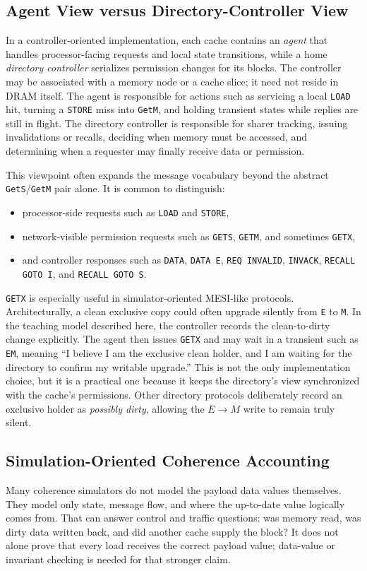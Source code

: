 \subsection*{Agent View versus Directory-Controller View}
In a controller-oriented implementation, each cache contains an \textit{agent} that handles processor-facing requests and local state transitions, while a home \textit{directory controller} serializes permission changes for its blocks.
The controller may be associated with a memory node or a cache slice; it need not reside in DRAM itself.
The agent is responsible for actions such as servicing a local \texttt{LOAD} hit, turning a \texttt{STORE} miss into \texttt{GetM}, and holding transient states while replies are still in flight.
The directory controller is responsible for sharer tracking, issuing invalidations or recalls, deciding when memory must be accessed, and determining when a requester may finally receive data or permission.

This viewpoint often expands the message vocabulary beyond the abstract \texttt{GetS}/\texttt{GetM} pair alone.
It is common to distinguish:
\begin{itemize}
    \item processor-side requests such as \texttt{LOAD} and \texttt{STORE},
    \item network-visible permission requests such as \texttt{GETS}, \texttt{GETM}, and sometimes \texttt{GETX},
    \item and controller responses such as \texttt{DATA}, \texttt{DATA E}, \texttt{REQ INVALID}, \texttt{INVACK}, \texttt{RECALL GOTO I}, and \texttt{RECALL GOTO S}.
\end{itemize}

\texttt{GETX} is especially useful in simulator-oriented MESI-like protocols.
Architecturally, a clean exclusive copy could often upgrade silently from \texttt{E} to \texttt{M}.
In the teaching model described here, the controller records the clean-to-dirty change explicitly.
The agent then issues \texttt{GETX} and may wait in a transient such as \texttt{EM}, meaning ``I believe I am the exclusive clean holder, and I am waiting for the directory to confirm my writable upgrade.''
This is not the only implementation choice, but it is a practical one because it keeps the directory's view synchronized with the cache's permissions.
Other directory protocols deliberately record an exclusive holder as \emph{possibly dirty}, allowing the $E\rightarrow M$ write to remain truly silent.

\subsection*{Simulation-Oriented Coherence Accounting}
Many coherence simulators do not model the payload data values themselves.
They model only state, message flow, and where the up-to-date value logically comes from.
That can answer control and traffic questions: was memory read, was dirty data written back, and did another cache supply the block?
It does not alone prove that every load receives the correct payload value; data-value or invariant checking is needed for that stronger claim.

